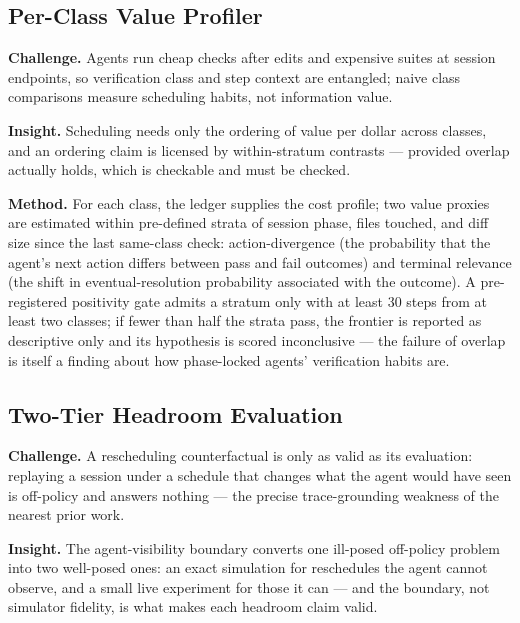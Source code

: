 \documentclass[11pt]{article}
\begin{document}
\subsection{Per-Class Value Profiler}

\textbf{Challenge.} Agents run cheap checks after edits and expensive suites at session endpoints, so verification class and step context are entangled; naive class comparisons measure scheduling habits, not information value.

\textbf{Insight.} Scheduling needs only the ordering of value per dollar across classes, and an ordering claim is licensed by within-stratum contrasts --- provided overlap actually holds, which is checkable and must be checked.

\textbf{Method.} For each class, the ledger supplies the cost profile; two value proxies are estimated within pre-defined strata of session phase, files touched, and diff size since the last same-class check: action-divergence (the probability that the agent's next action differs between pass and fail outcomes) and terminal relevance (the shift in eventual-resolution probability associated with the outcome). A pre-registered positivity gate admits a stratum only with at least 30 steps from at least two classes; if fewer than half the strata pass, the frontier is reported as descriptive only and its hypothesis is scored inconclusive --- the failure of overlap is itself a finding about how phase-locked agents' verification habits are.

\subsection{Two-Tier Headroom Evaluation}

\textbf{Challenge.} A rescheduling counterfactual is only as valid as its evaluation: replaying a session under a schedule that changes what the agent would have seen is off-policy and answers nothing --- the precise trace-grounding weakness of the nearest prior work.

\textbf{Insight.} The agent-visibility boundary converts one ill-posed off-policy problem into two well-posed ones: an exact simulation for reschedules the agent cannot observe, and a small live experiment for those it can --- and the boundary, not simulator fidelity, is what makes each headroom claim valid.
\end{document}
